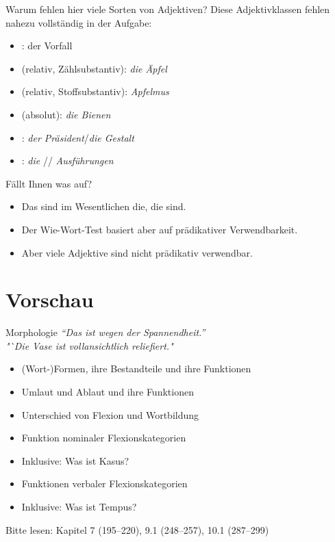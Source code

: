 \begin{frame}
  {Warum fehlen hier viele Sorten von Adjektiven?}
  \pause
  \small
  Diese Adjektivklassen fehlen nahezu vollständig in der Aufgabe:
  \pause
  \begin{itemize}[<+->]
    \item {}: der  Vorfall
    \item {} (relativ, Zählsubstantiv): \textit{die  Äpfel}
    \item {} (relativ, Stoffsubstantiv): \textit{ Apfelmus}
    \item {} (absolut): \textit{die  Bienen}
    \item {}: \textit{der  Präsident}\slash\textit{die  Gestalt}
    \item {}: \textit{die }/\textit{}/\textit{ Ausführungen}
  \end{itemize}
  \pause
  \Halbzeile
  Fällt Ihnen was auf?
  \pause
  \begin{itemize}[<+->]
    \item Das sind im Wesentlichen die, die  sind.
    \item Der Wie-Wort-Test basiert aber auf prädikativer Verwendbarkeit.
    \item Aber viele Adjektive sind nicht prädikativ verwendbar. 
  \end{itemize}
  \pause
  \centering
\end{frame}


\section{Vorschau}

\begin{frame}
  {Morphologie}
  \pause
  \textit{"`Das ist wegen der Spannendheit."'}\\
  \pause
  \textit{"`Die Vase ist vollansichtlich reliefiert."}\\
  \Zeile
  \pause
  \begin{itemize}[<+->]
    \item (Wort-)Formen, ihre Bestandteile und ihre Funktionen
    \item Umlaut und Ablaut und ihre Funktionen
    \item Unterschied von Flexion und Wortbildung
      \Zeile
    \item Funktion nominaler Flexionskategorien
    \item {} \alert{Inklusive: Was ist Kasus?}
    \item Funktionen verbaler Flexionskategorien
    \item {} \alert{Inklusive: Was ist Tempus?}
  \end{itemize}
  \pause
  \Zeile
  \centering
  Bitte lesen: \alert{Kapitel 7 (195--220), 9.1 (248--257), 10.1 (287--299)}

  \pause
  \pause
  \pause
  \pause
  \pause
\end{frame}

